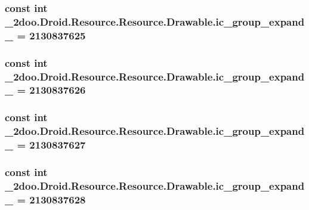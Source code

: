\hypertarget{class__2doo_1_1_droid_1_1_resource_1_1_drawable_98a6c2beb5ddd707b7c2045abb5f9397}{
\subsubsection[{ic\_\-group\_\-expand\_\-10}]{\setlength{\rightskip}{0pt plus 5cm}const int \_\-2doo.Droid.Resource.Resource.Drawable.ic\_\-group\_\-expand\_ = 2130837625}}
\label{class__2doo_1_1_droid_1_1_resource_1_1_drawable_98a6c2beb5ddd707b7c2045abb5f9397}


\hypertarget{class__2doo_1_1_droid_1_1_resource_1_1_drawable_ebab01946857ebc3fd3bbaf9c3e0f168}{
\subsubsection[{ic\_\-group\_\-expand\_\-11}]{\setlength{\rightskip}{0pt plus 5cm}const int \_\-2doo.Droid.Resource.Resource.Drawable.ic\_\-group\_\-expand\_ = 2130837626}}
\label{class__2doo_1_1_droid_1_1_resource_1_1_drawable_ebab01946857ebc3fd3bbaf9c3e0f168}


\hypertarget{class__2doo_1_1_droid_1_1_resource_1_1_drawable_41486611a94bf1d7bdff1b39bce1a0d2}{
\subsubsection[{ic\_\-group\_\-expand\_\-12}]{\setlength{\rightskip}{0pt plus 5cm}const int \_\-2doo.Droid.Resource.Resource.Drawable.ic\_\-group\_\-expand\_ = 2130837627}}
\label{class__2doo_1_1_droid_1_1_resource_1_1_drawable_41486611a94bf1d7bdff1b39bce1a0d2}


\hypertarget{class__2doo_1_1_droid_1_1_resource_1_1_drawable_7b1771cc82610fd4630d25aeea16f4d4}{
\subsubsection[{ic\_\-group\_\-expand\_\-13}]{\setlength{\rightskip}{0pt plus 5cm}const int \_\-2doo.Droid.Resource.Resource.Drawable.ic\_\-group\_\-expand\_ = 2130837628}}
\label{class__2doo_1_1_droid_1_1_resource_1_1_drawable_7b1771cc82610fd4630d25aeea16f4d4}


